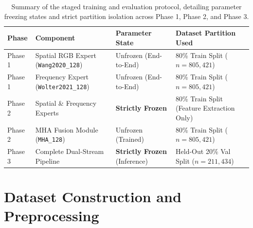 \documentclass[fleqn,10pt]{wlscirep}
\begin{document}
\begin{table}[htbp]
\centering
\begin{tabular}{|l|l|l|l|}
\hline
\textbf{Phase} & \textbf{Component} & \textbf{Parameter State} & \textbf{Dataset Partition Used} \\ \hline
Phase 1 & Spatial RGB Expert (\texttt{Wang2020\_128}) & Unfrozen (End-to-End) & 80\% Train Split ($n=805{,}421$) \\ \hline
Phase 1 & Frequency Expert (\texttt{Wolter2021\_128}) & Unfrozen (End-to-End) & 80\% Train Split ($n=805{,}421$) \\ \hline
Phase 2 & Spatial \& Frequency Experts & \textbf{Strictly Frozen} & 80\% Train Split (Feature Extraction Only) \\ \hline
Phase 2 & MHA Fusion Module (\texttt{MHA\_128}) & Unfrozen (Trained) & 80\% Train Split ($n=805{,}421$) \\ \hline
Phase 3 & Complete Dual-Stream Pipeline & \textbf{Strictly Frozen} (Inference) & Held-Out 20\% Val Split ($n=211{,}434$) \\ \hline
\end{tabular}
\caption{Summary of the staged training and evaluation protocol, detailing parameter freezing states and strict partition isolation across Phase 1, Phase 2, and Phase 3.}
\label{tab:training_summary}
\end{table}

\section*{Dataset Construction and Preprocessing}
\end{document}
